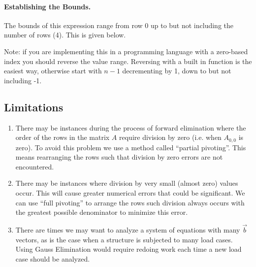 \documentclass{../../KDHnotes}
\begin{document}
\paragraph{Establishing the Bounds.}
The bounds of this expression range from row 0 up to but not including the number of rows (4). This is given below.



Note: if you are implementing this in a programming language with a zero-based index you should reverse the value range. Reversing with a built in function is the easiest way, otherwise start with $n-1$ decrementing by 1, down to but not including -1.


\subsection{Limitations}
\begin{enumerate}
\item There may be instances during the process of forward elimination where the order of the rows in the matrix $A$ require division by zero (i.e. when $A_{0,0}$ is zero). To avoid this problem we use a method called ``partial pivoting''. This means rearranging the rows such that division by zero errors are not encountered.

\item There may be instances where division by very small (almost zero) values occur. This will cause greater numerical errors that could be significant. We can use ``full pivoting'' to arrange the rows such division always occurs with the greatest possible denominator to minimize this error.

\item There are times we may want to analyze a system of equations with many $\vec{b}$ vectors, as is the case when a structure is subjected to many load cases. Using Gauss Elimination would require redoing work each time a new load case should be analyzed.
\end{enumerate}

\nocite{NumMethods}
\nocite{holisticnumericalmethods}

\newpage



\end{document}
